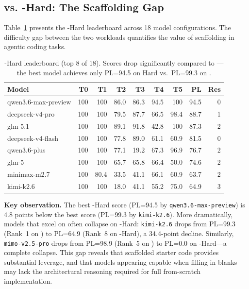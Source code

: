 \subsection{\yatcc{} vs. \yatcc{}-Hard: The Scaffolding Gap}

Table~\ref{tab:hard} presents the \yatcc{}-Hard leaderboard across 18 model configurations.
The difficulty gap between the two workloads quantifies the value of scaffolding in agentic coding tasks.

\begin{table}[!t]
\centering
\small
\begin{tabular}{lrrrrrrrr}
\toprule
\textbf{Model} & \textbf{T0} & \textbf{T1} & \textbf{T2} & \textbf{T3} & \textbf{T4} & \textbf{T5} & \textbf{PL} & \textbf{Res} \\
\midrule
qwen3.6-max-preview & 100 & 100 & 86.0 & 86.3 & 94.5 & 100 & 94.5 & 0 \\
deepseek-v4-pro & 100 & 100 & 79.5 & 87.7 & 66.5 & 98.4 & 88.7 & 1 \\
glm-5.1 & 100 & 100 & 89.1 & 91.8 & 42.8 & 100 & 87.3 & 2 \\
deepseek-v4-flash & 100 & 100 & 77.8 & 89.0 & 61.1 & 60.9 & 81.5 & 0 \\
qwen3.6-plus & 100 & 100 & 77.1 & 19.2 & 67.3 & 96.9 & 76.7 & 2 \\
glm-5 & 100 & 100 & 65.7 & 65.8 & 66.4 & 50.0 & 74.6 & 2 \\
minimax-m2.7 & 100 & 80.4 & 33.5 & 41.1 & 66.1 & 60.9 & 63.7 & 2 \\
kimi-k2.6 & 100 & 100 & 18.0 & 41.1 & 55.2 & 75.0 & 64.9 & 3 \\
\bottomrule
\end{tabular}
\caption{\yatcc{}-Hard leaderboard (top 8 of 18). Scores drop significantly compared to \yatcc{}---the best model achieves only PL=94.5 on Hard vs.\ PL=99.3 on \yatcc{}.}
\label{tab:hard}
\end{table}

\textbf{Key observation.}
The best \yatcc{}-Hard score (PL=94.5 by \texttt{qwen3.6-max-preview}) is 4.8 points below the best \yatcc{} score (PL=99.3 by \texttt{kimi-k2.6}).
More dramatically, models that excel on \yatcc{} often collapse on \yatcc{}-Hard: \texttt{kimi-k2.6} drops from PL=99.3 (Rank~1 on \yatcc{}) to PL=64.9 (Rank~8 on \yatcc{}-Hard), a 34.4-point decline.
Similarly, \texttt{mimo-v2.5-pro} drops from PL=98.9 (Rank~5 on \yatcc{}) to PL=0.0 on \yatcc{}-Hard---a complete collapse.
This gap reveals that scaffolded starter code provides substantial leverage, and that models appearing capable when filling in blanks may lack the architectural reasoning required for full from-scratch implementation.


